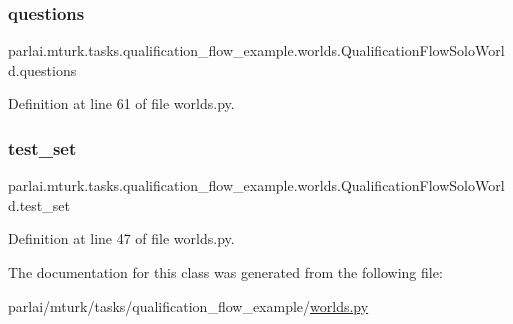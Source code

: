 \subsubsection{\texorpdfstring{questions}{questions}}
{\footnotesize\ttfamily parlai.\+mturk.\+tasks.\+qualification\+\_\+flow\+\_\+example.\+worlds.\+Qualification\+Flow\+Solo\+World.\+questions}



Definition at line 61 of file worlds.\+py.

\mbox{\label{classparlai_1_1mturk_1_1tasks_1_1qualification__flow__example_1_1worlds_1_1QualificationFlowSoloWorld_a255e673bf9502097ffcb79fd26191d37}} 
\subsubsection{\texorpdfstring{test\+\_\+set}{test\_set}}
{\footnotesize\ttfamily parlai.\+mturk.\+tasks.\+qualification\+\_\+flow\+\_\+example.\+worlds.\+Qualification\+Flow\+Solo\+World.\+test\+\_\+set\hspace{0.3cm}{\ttfamily [static]}}



Definition at line 47 of file worlds.\+py.



The documentation for this class was generated from the following file\+:\begin{DoxyCompactItemize}
\item 
parlai/mturk/tasks/qualification\+\_\+flow\+\_\+example/\hyperlink{parlai_2mturk_2tasks_2qualification__flow__example_2worlds_8py}{worlds.\+py}\end{DoxyCompactItemize}

